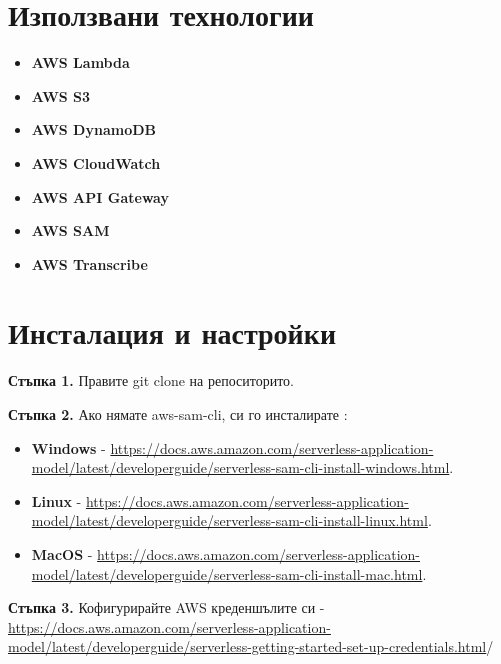 \documentclass[12pt]{article}
\begin{document}
\section{Използвани технологии}
\begin{itemize}
    \item \textbf{AWS Lambda}
    \item \textbf{AWS S3}
    \item \textbf{AWS DynamoDB}
    \item \textbf{AWS CloudWatch} 
    \item \textbf{AWS API Gateway}
    \item \textbf{AWS SAM}
    \item \textbf{AWS Transcribe}

\end{itemize}


\section{Инсталация и настройки}
\noindent\textbf{Стъпка 1.} Правите git clone на репоситорито.

\medskip

\noindent\textbf{Стъпка 2.} Ако нямате aws-sam-cli, си го инсталирате : 
\begin{itemize}

\item  \noindent\textbf{Windows} - \url{https://docs.aws.amazon.com/serverless-application-model/latest/developerguide/serverless-sam-cli-install-windows.html}.

\item  \noindent\textbf{Linux} - \url{https://docs.aws.amazon.com/serverless-application-model/latest/developerguide/serverless-sam-cli-install-linux.html}. 

\item \noindent\textbf{MacOS} - \url{https://docs.aws.amazon.com/serverless-application-model/latest/developerguide/serverless-sam-cli-install-mac.html}.

\end{itemize}

\medskip

\noindent\textbf{Стъпка 3.} Кофигурирайте AWS креденшълите си - \url{https://docs.aws.amazon.com/serverless-application-model/latest/developerguide/serverless-getting-started-set-up-credentials.html}/

\medskip
\end{document}
